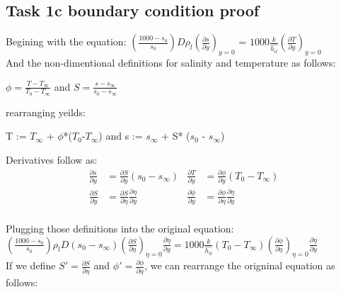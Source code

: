 \documentclass[letterpaper, 10pt]{article}
\begin{document}
	\subsection*{Task 1c boundary condition proof} %
	\label{ssec:Task 1c}
	Begining with the equation: $\left( \frac{1000-s_0}{s_0} \right) D \rho_l \left( \frac{\partial s}{\partial y} \right)_{y = 0}$ = $1000 \frac{k}{\hat{h_{il}}}  \left (\frac{\partial T}{\partial y} \right)_{y = 0}$\\

	\noindent And the non-dimentional definitions for salinity and temperature as follows:\\
	\begin{center}
		$\phi = \frac{T-T_\infty}{T_0-T_\infty}$ and $S = \frac{s - s_\infty}{s_0 - s_\infty}$
	\end{center}

	\noindent rearranging yeilds:\\
	\begin{center}
		T := $T_\infty$ + $\phi$*($T_0$-$T_\infty$) and s := $s_\infty $ + S* ($s_0$ - $s_\infty $)
	\end{center}

	\noindent Derivatives follow as:\\
	\begin{align*}
		\frac{\partial s}{\partial y} &= \frac{\partial S}{\partial y}(s_0 - s_\infty) & 		\frac{\partial T}{\partial y} &= \frac{\partial \phi}{\partial y}(T_0 - T_\infty)\\
		\frac{\partial S}{\partial y} &=  \frac{\partial S}{\partial \eta}  \frac{\partial \eta}{\partial y} & \frac{\partial \phi}{\partial y} &=  \frac{\partial \phi}{\partial \eta}\frac{\partial \eta}{\partial y}\\
	\end{align*}

	\noindent Plugging those definitions into the original equation:\\
	$\left(\frac{1000 - s_0}{s_0}\right) \rho_l D (s_0 - s_\infty) \left(\frac{\partial S}{\partial \eta}\right)_{\eta = 0} \frac{\partial \eta}{\partial y} = 1000 \frac{k}{\hat{h_{il}}} (T_0 - T_\infty) \left(\frac{\partial \phi}{\partial \eta}\right)_{\eta = 0}\frac{\partial \eta}{\partial y}$\\

	\noindent If we define $S' = \frac{\partial S}{\partial \eta} $ and $ \phi ' = \frac{\partial \phi}{\partial \eta}$, we can rearrange the origninal equation as follows:\\
\end{document}
